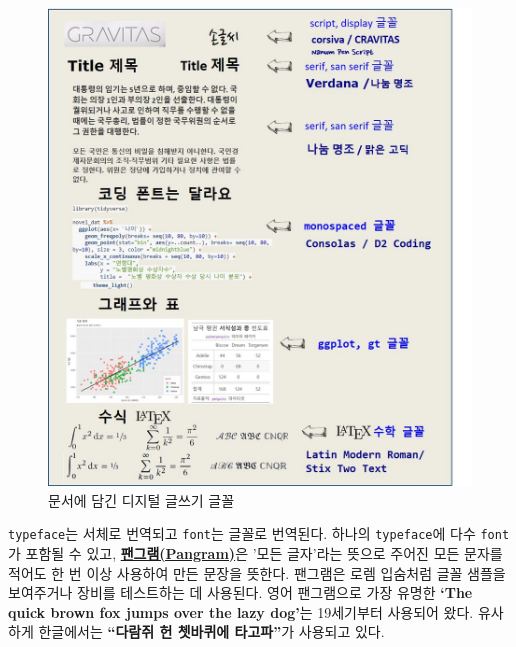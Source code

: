 \documentclass[
  letterpaper,
]{book}
\begin{document}
\begin{figure}

{\centering \includegraphics{images/document_fonts.jpg}

}

\caption{문서에 담긴 디지털 글쓰기 글꼴}

\end{figure}

\begin{tcolorbox}[enhanced jigsaw, opacityback=0, opacitybacktitle=0.6, colback=white, rightrule=.15mm, coltitle=black, colframe=quarto-callout-note-color-frame, colbacktitle=quarto-callout-note-color!10!white, bottomrule=.15mm, bottomtitle=1mm, breakable, title=\textcolor{quarto-callout-note-color}{\faInfo}\hspace{0.5em}{서체와 글꼴}, titlerule=0mm, leftrule=.75mm, toptitle=1mm, left=2mm, arc=.35mm, toprule=.15mm]

\texttt{typeface}는 서체로 번역되고 \texttt{font}는 글꼴로 번역된다.
하나의 \texttt{typeface}에 다수 \texttt{font}가 포함될 수 있고,
\href{https://ko.wikipedia.org/wiki/팬그램}{\textbf{팬그램(Pangram)}}은
'모든 글자'라는 뜻으로 주어진 모든 문자를 적어도 한 번 이상 사용하여
만든 문장을 뜻한다. 팬그램은 로렘 입숨처럼 글꼴 샘플을 보여주거나 장비를
테스트하는 데 사용된다. 영어 팬그램으로 가장 유명한 \textbf{`The quick
brown fox jumps over the lazy dog'}는 19세기부터 사용되어 왔다. 유사하게
한글에서는 \textbf{``다람쥐 헌 쳇바퀴에 타고파''}가 사용되고 있다.

\end{tcolorbox}
\end{document}
